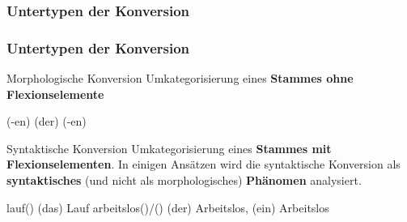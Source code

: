 \subsubsection{Untertypen der Konversion}

\begin{frame}
\frametitle{Untertypen der Konversion}


\begin{block}{Morphologische Konversion}
Umkategorisierung eines \textbf{Stammes ohne Flexionselemente}
\end{block}

\eal 
\ex {}(-en) \ras (der) 
\ex {} \ras {}(-en)
\zl

\pause 

\begin{block}{Syntaktische Konversion}
Umkategorisierung eines \textbf{Stammes mit Flexionselementen}. In einigen Ansätzen wird die syntaktische Konversion als \textbf{syntaktisches} (und nicht als morphologisches) \textbf{Phänomen} analysiert.
\end{block}

\eal 
\ex {}lauf() \ras  (das) Lauf 
\ex {}arbeitslos()/() \ras (der) Arbeitslos, (ein) Arbeitslos
\zl

\end{frame}


